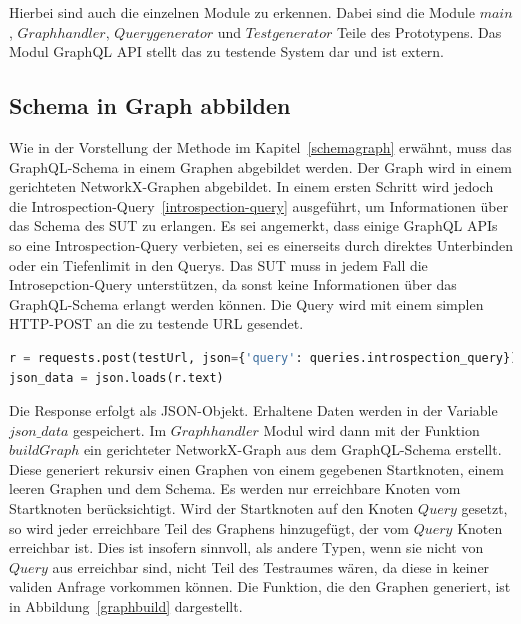 Hierbei sind auch die einzelnen Module zu erkennen.
Dabei sind die Module $main$, $Graphhandler$, $Querygenerator$ und $Testgenerator$ Teile des Prototypens.
Das Modul GraphQL API stellt das zu testende System dar und ist extern.

\subsection{Schema in Graph abbilden}

Wie in der Vorstellung der Methode im Kapitel~\ref{schemagraph} erwähnt, muss das GraphQL-Schema in einem Graphen abgebildet werden.
Der Graph wird in einem gerichteten NetworkX-Graphen abgebildet.
In einem ersten Schritt wird jedoch die Introspection-Query~\ref{introspection-query} ausgeführt, um Informationen über das Schema des SUT zu erlangen.
Es sei angemerkt, dass einige GraphQL APIs so eine Introspection-Query verbieten, sei es einerseits durch direktes Unterbinden oder ein Tiefenlimit in den Querys.
Das SUT muss in jedem Fall die Introsepction-Query unterstützen, da sonst keine Informationen über das GraphQL-Schema erlangt werden können.
Die Query wird mit einem simplen HTTP-POST an die zu testende URL gesendet.

\begin{lstlisting}[language=Python, caption={Absenden der Introspection-Query}]
r = requests.post(testUrl, json={'query': queries.introspection_query})
json_data = json.loads(r.text)
\end{lstlisting}

Die Response erfolgt als JSON-Objekt.
Erhaltene Daten werden in der Variable $json\_data$ gespeichert.
Im $Graphhandler$ Modul wird dann mit der Funktion $buildGraph$ ein gerichteter NetworkX-Graph aus dem GraphQL-Schema erstellt.
Diese generiert rekursiv einen Graphen von einem gegebenen Startknoten, einem leeren Graphen und dem Schema.
Es werden nur erreichbare Knoten vom Startknoten berücksichtigt.
Wird der Startknoten auf den Knoten $Query$ gesetzt, so wird jeder erreichbare Teil des Graphens hinzugefügt, der vom $Query$ Knoten erreichbar ist.
Dies ist insofern sinnvoll, als andere Typen, wenn sie nicht von $Query$ aus erreichbar sind, nicht Teil des Testraumes wären, da diese in keiner validen Anfrage vorkommen können.
Die Funktion, die den Graphen generiert, ist in Abbildung~\ref{graphbuild} dargestellt.

